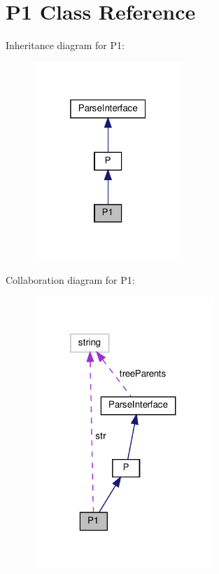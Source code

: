 \hypertarget{classP1}{}\section{P1 Class Reference}
\label{classP1}


Inheritance diagram for P1\+:
\nopagebreak
\begin{figure}[H]
\begin{center}
\leavevmode
\includegraphics[width=160pt]{classP1__inherit__graph}
\end{center}
\end{figure}


Collaboration diagram for P1\+:
\nopagebreak
\begin{figure}[H]
\begin{center}
\leavevmode
\includegraphics[width=193pt]{classP1__coll__graph}
\end{center}
\end{figure}
